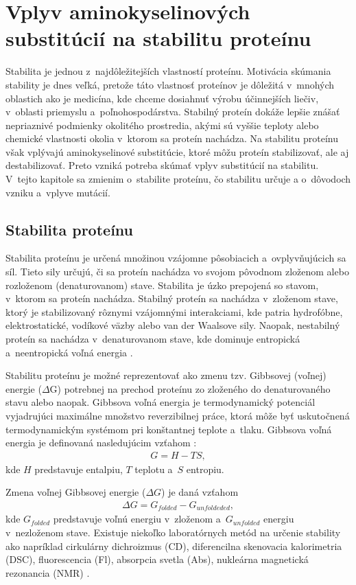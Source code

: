 \chapter{Vplyv aminokyselinových substitúcií na stabilitu proteínu}

Stabilita je jednou z~najdôležitejších vlastností proteínu. Motivácia skúmania stability je dnes veľká, pretože táto vlastnosť proteínov je dôležitá v~mnohých oblastich ako je medicína, kde chceme dosiahnuť výrobu účinnejších liečiv, v~oblasti priemyslu a~poľnohospodárstva. Stabilný proteín dokáže lepšie znášať nepriaznivé podmienky okolitého prostredia, akými sú vyššie teploty alebo chemické vlastnosti okolia v~ktorom sa proteín nachádza. Na stabilitu proteínu však vplývajú aminokyselinové substitúcie, ktoré môžu proteín stabilizovať, ale aj destabilizovať. Preto vzniká potreba skúmať vplyv substitúcií na stabilitu. V~tejto kapitole sa zmienim o~stabilite proteínu, čo stabilitu určuje a o~dôvodoch vzniku a~vplyve mutácií.


\section{Stabilita proteínu}
Stabilita proteínu je určená množinou vzájomne pôsobiacich a~ovplyvňujúcich sa síl. Tieto sily určujú, či sa proteín nachádza vo svojom pôvodnom zloženom alebo rozloženom (denaturovanom) stave. Stabilita je úzko prepojená so stavom, v~ktorom sa proteín nachádza. Stabilný proteín sa nachádza v~zloženom stave, ktorý je stabilizovaný rôznymi vzájomnými interakciami, kde patria hydrofóbne, elektrostatické, vodíkové väzby alebo van der Waalsove sily. Naopak, nestabilný proteín sa nachádza v~denaturovanom stave, kde dominuje entropická a~neentropická voľná energia \cite{gromiha}.

Stabilitu proteínu je možné reprezentovať ako zmenu tzv. Gibbsovej (voľnej) energie ($\Delta$G) potrebnej na prechod proteínu zo zloženého do denaturovaného stavu alebo naopak. 
Gibbsova voľná energia je termodynamický potenciál vyjadrujúci maximálne množstvo reverzibilnej práce, ktorá môže byť uskutočnená termodynamickým systémom pri konštantnej teplote a~tlaku. Gibbsova voľná energia je definovaná nasledujúcim vzťahom \cite{gibbs}:
\begin{align}
	G = H - TS,
\end{align}
kde $H$ predstavuje entalpiu, $T$ teplotu a~$S$ entropiu.

Zmena voľnej Gibbsovej energie ($\Delta G$) je daná vzťahom
\begin{align}
	\Delta G = G_{folded} - G_{unfoldeded},
\end{align}
kde $G_{folded}$ predstavuje voľnú energiu v~zloženom a~$G_{unfolded}$ energiu v~nezloženom stave.
Existuje niekoľko laboratórnych metód na určenie stability ako napríklad cirkulárny dichroizmus (CD), diferencilna skenovacia kalorimetria (DSC), fluorescencia (Fl), absorpcia svetla (Abs), nukleárna magnetická rezonancia (NMR) \cite{gromiha}.

